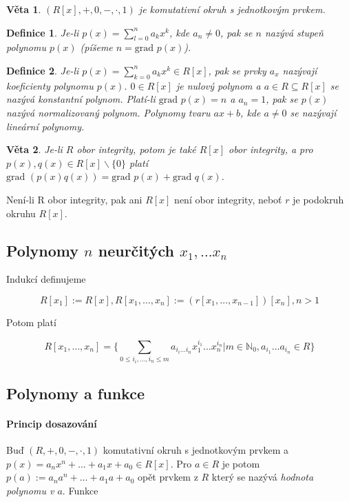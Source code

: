 \documentclass[a4paper, 11pt]{report}
\newtheorem{mydef}{Definice}[chapter]
\newtheorem{veta}{Věta}
\begin{document}
\begin{veta}
$(R[x], +, 0, -, \cdot, 1)$ je komutativní okruh s jednotkovým prvkem.
\end{veta}

\begin{mydef}
Je-li $p(x) = \sum_{l = 0}^n a_k x^k$, kde $a_n \not= 0$, pak se $n$ nazývá stupeň polynomu $p(x)$ (píšeme $n = \text{grad } p(x)$). 
\end{mydef}

\begin{mydef}
Je-li $p(x) = \sum_{k = 0}^n a_k x^k \in R[x]$, pak se prvky $a_x$ nazývají koeficienty polynomu $p(x)$. $0 \in R[x]$ je nulový polynom a $a \in R \subseteq R[x]$ se nazývá konstantní polynom. Platí-li $\text{grad } p(x) = n$ a $a_n = 1$, pak se $p(x)$ nazývá normalizovaný polynom. Polynomy tvaru $ax + b$, kde $a \not= 0$ se nazývají lineární polynomy.
\end{mydef}

\begin{veta}
Je-li $R$ obor integrity, potom je také $R[x]$ obor integrity, a pro $p(x), q(x) \in R[x] \backslash \{0\}$ platí $\text{grad } (p(x)q(x)) = \text{grad } p(x) + \text{grad } q(x)$.
\end{veta}

Není-li R obor integrity, pak ani $R[x]$ není obor integrity, neboť $r$ je podokruh  okruhu $R[x]$.

\subsection{Polynomy $n$ neurčitých $x_1, \dots x_n$}

Indukcí definujeme

$$R[x_1] := R[x], R[x_1, \dots, x_n] := (r[x_1, \dots, x_{n-1}])[x_n], n > 1$$

Potom platí

$$ R[x_1, \dots, x_n] = \{ \sum\limits_{0 \leq i_i, \dots, i_n \leq m} a_{i_i \dots i_n} x_1^{i_1} \dots x_n^{i_n} | m \in \mathbb{N}_0, a_{i_1} \dots a_{i_n} \in R \} $$

\subsection{Polynomy a funkce}
\paragraph{Princip dosazování} Buď $(R, +, 0, -, \cdot, 1)$ komutativní okruh s jednotkovým prvkem a $p(x) = a_n x^n + \dots + a_1 x + a_0 \in R[x]$. Pro $a \in R$ je potom $p(a) := a_n a^n + \dots + a_1 a + a_0$ opět prvkem z $R$ který se nazývá \emph{hodnota polynomu v $a$}. Funkce
\end{document}
